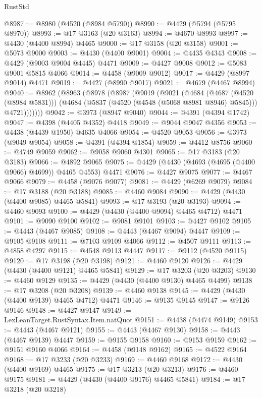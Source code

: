 \begin{lexlean}{RustStd}
\begin{coremodule}
@8987 := @8980 (@4520 (@8984 @5790))
@8990 := @4429 (@5794 (@5795 @8970))
@8993 := @17 @3163 (@20 @3163)
@8994 := @4670 @8993
@8997 := @4430 (@4400 @8994) @4465
@9000 := @17 @3158 (@20 @3158)
@9001 := @5073 @9000
@9003 := @4430 (@4400 @9001)
@9004 := @4435 @4343
@9008 := @4429 (@9003 @9004 @4445) @4471
@9009 := @4427 @9008
@9012 := @5083 @9001 @5815 @4066
@9014 := @4458 (@9009 @9012)
@9017 := @4429 (@8997 @9014) @4471
@9019 := @4427 (@8990 @9017)
@9021 := @4679 (@4467 @8994)
@9040 := @8962
    (@8963
      (@8978
        (@8987
          (@9019
            (@9021
              (@4684
                (@4687 (@4520 (@8984 @5831)))
                (@4684 (@5837 (@4520 (@4548 (@5068 @8981 @8946) @5845))) @4721)))))))
@9042 := @3973 (@8947 @9040)
@9044 := @4391 (@4394 @1742)
@9047 := @4398 (@4405 @4352) @4418
@9049 := @9044 @9047 @4356
@9053 := @4438 (@4439 @1950) @4635 @4066
@9054 := @4520 @9053
@9056 := @3973 (@9049 @9054)
@9058 := @4391 (@4394 @1854)
@9059 := @4412 @8756
@9060 := @4749 @9059
@9062 := @9058 @9060 @4301
@9065 := @17 @3183 (@20 @3183)
@9066 := @4892 @9065
@9075 := @4429 (@4430 (@4693 (@4695 (@4400 @9066) @4699)) @4465 @4553) @4471
@9076 := @4427 @9075
@9077 := @4467 @9066
@9079 := @4458 (@9076 @9077)
@9081 := @4429 (@6269 @9079)
@9084 := @17 @3188 (@20 @3188)
@9085 := @4460 @9084
@9090 := @4429 (@4430 (@4400 @9085) @4465 @5841)
@9093 := @17 @3193 (@20 @3193)
@9094 := @4460 @9093
@9100 := @4429 (@4430 (@4400 @9094) @4465 @4712) @4471
@9101 := @9090 @9100
@9102 := @9081 @9101
@9103 := @4427 @9102
@9105 := @4443 (@4467 @9085)
@9108 := @4443 (@4467 @9094) @4447
@9109 := @9105 @9108
@9111 := @7103 @9109 @4066
@9112 := @4507 @9111
@9113 := @4858 @4297
@9115 := @4548 @9113 @4447
@9117 := @9112 (@4520 @9115)
@9120 := @17 @3198 (@20 @3198)
@9121 := @4460 @9120
@9126 := @4429 (@4430 (@4400 @9121) @4465 @5841)
@9129 := @17 @3203 (@20 @3203)
@9130 := @4460 @9129
@9135 := @4429 (@4430 (@4400 @9130) @4465 @4499)
@9138 := @17 @3208 (@20 @3208)
@9139 := @4460 @9138
@9145 := @4429 (@4430 (@4400 @9139) @4465 @4712) @4471
@9146 := @9135 @9145
@9147 := @9126 @9146
@9148 := @4427 @9147
@9149 := LexLeanTarget.RustSyntax.Item.natQuot
@9151 := @4438 (@4474 @9149)
@9153 := @4443 (@4467 @9121)
@9155 := @4443 (@4467 @9130)
@9158 := @4443 (@4467 @9139) @4447
@9159 := @9155 @9158
@9160 := @9153 @9159
@9162 := @9151 @9160 @4066
@9164 := @4458 (@9148 @9162)
@9165 := @4522 @9164
@9168 := @17 @3233 (@20 @3233)
@9169 := @4460 @9168
@9172 := @4430 (@4400 @9169) @4465
@9175 := @17 @3213 (@20 @3213)
@9176 := @4460 @9175
@9181 := @4429 (@4430 (@4400 @9176) @4465 @5841)
@9184 := @17 @3218 (@20 @3218)

\end{coremodule}
\end{lexlean}
